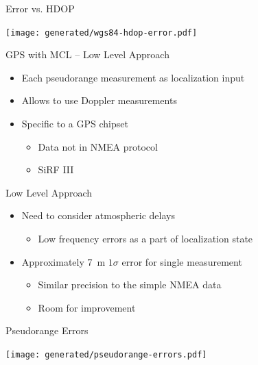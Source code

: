 \documentclass[utf8,12pt]{beamer}
\begin{document}
\begin{frame}[plain]{Error vs. HDOP}
\begin{center}
\centerline{\texttt{[image: generated/wgs84-hdop-error.pdf]}}
\end{center}
\end{frame}

{
\begin{frame}{GPS with MCL -- Low Level Approach}
    \begin{itemize}
        \item Each pseudorange measurement as localization input
        \item Allows to use Doppler measurements
        \item Specific to a GPS chipset
        \begin{itemize}
            \item Data not in NMEA protocol
            \item SiRF III
        \end{itemize}
    \end{itemize}
\end{frame}
}

\begin{frame}{Low Level Approach}
    \begin{itemize}
        \item Need to consider atmospheric delays
        \begin{itemize}
            \item Low frequency errors as a part of localization state
        \end{itemize}
        \item Approximately \SI{7}{\meter} \(1\sigma\) error for single measurement
        \begin{itemize}
            \item Similar precision to the simple NMEA data
            \item Room for improvement
        \end{itemize}
    \end{itemize}
\end{frame}

\begin{frame}[plain]{Pseudorange Errors}
\begin{center}
\centerline{\texttt{[image: generated/pseudorange-errors.pdf]}}
\end{center}
\end{frame}
\end{document}
